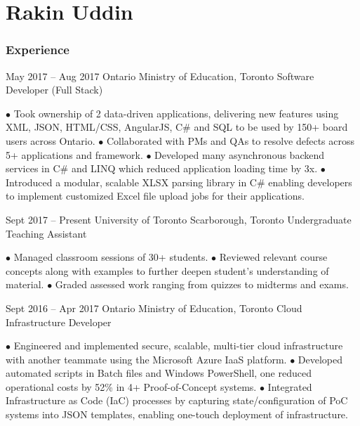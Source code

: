\documentclass[fontsize=10pt]{tccv}
\begin{document}
	
	\part{Rakin Uddin}
	
	\section{Experience}
	
	\begin{eventlist}
		
		\item{May 2017 -- Aug 2017}
		{Ontario Ministry of Education, Toronto}
		{Software Developer (Full Stack)}
		
		$\bullet$ Took ownership of 2 data-driven applications, delivering new features using XML, JSON, HTML/CSS, AngularJS, C\# and SQL to be used by 150+ board users across Ontario.\newline
		$\bullet$ Collaborated with PMs and QAs to resolve defects across 5+ applications and framework.\newline
		$\bullet$ Developed many asynchronous backend services in C\# and LINQ which reduced application loading time by 3x.\newline
		$\bullet$ Introduced a modular, scalable XLSX parsing library in C\# enabling developers to implement customized Excel file upload jobs for their applications.
		
		\item{Sept 2017 -- Present}
		{University of Toronto Scarborough, Toronto}
		{Undergraduate Teaching Assistant}
		
		$\bullet$ Managed classroom sessions of 30+ students.\newline
		$\bullet$ Reviewed relevant course concepts along with examples to further deepen student’s understanding of material.\newline
		$\bullet$ Graded assessed work ranging from quizzes to midterms and exams.
		
		\item{Sept 2016 -- Apr 2017}
		{Ontario Ministry of Education, Toronto}
		{Cloud Infrastructure Developer}
		
		$\bullet$ Engineered and implemented secure, scalable, multi-tier cloud infrastructure with another teammate using the Microsoft Azure IaaS platform.\newline
		$\bullet$ Developed automated scripts in Batch files and Windows PowerShell, one reduced operational costs by 52\% in 4+ Proof-of-Concept systems.\newline
		$\bullet$ Integrated Infrastructure as Code (IaC) processes by capturing state/configuration of PoC systems into JSON templates, enabling one-touch deployment of infrastructure.
		

\end{eventlist}
\end{document}
